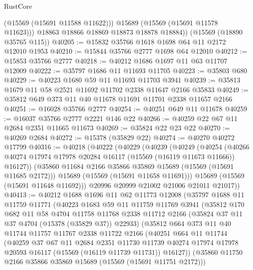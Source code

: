 \begin{lexlean}{RustCore}
\begin{coremodule}
            (@15569 (@15691 @11588 @11622)))
          @15689
          (@15569 (@15691 @11578 @11623)))
        @18863
        @18866
        @18869
        @18873
        @18878
        @18884))
    (@15569 (@18890 @35765 @115))
@40205 := @15832 @35766 @1618 @1698 @64 @11 @2172 @12010 @1953
@40210 := @15844 @35766 @2777 @1698 @64 @12010
@40212 := @15853 @35766 @2777
@40218 := @40212 @1686 @1697 @11 @63 @11707 @12009
@40222 := @35797 @1686 @11 @11693 @11705
@40223 := @35803 @680
@40229 := @40223 @1680 @59 @11 @11693 @11703 @3941
@40239 := @35813 @1679 @11 @58 @2521 @11692 @11702 @2338 @11647 @2166 @35833
@40249 := @35812 @649 @373 @11 @40 @11678 @11691 @11701 @2338 @11657 @2166
@40251 := @16028 @35766 @2777
@40254 := @40251 @649 @11 @11678
@40259 := @16037 @35766 @2777 @2221 @146 @22
@40266 := @40259 @22 @67 @11 @2684 @2351 @11665 @11673
@40269 := @35824 @22 @23 @22
@40270 := @40269 @2684
@40272 := @15378 (@35829 @22)
@40274 := @40270 @40272 @17799
@40316 := @40218
    (@40222
      (@40229
        (@40239
          (@40249
            (@40254
              (@40266 @40274 @17974 @17978 @20284 @16117 (@15569 (@16119 @11673 @11666)) @16127))
            (@35860 @11684 @2166 @35866 @35869 @15689 (@15569 (@15691 @11685 @2172)))
            @15689
            (@15569 (@15691 @11658 @11691)))
          @15689
          (@15569 (@15691 @11648 @11692)))
        @20996
        @20999
        @21002
        @21006
        @21011
        @21017))
@40413 := @40212
    @1688
    @1696
    @11
    @62
    @11773
    @12008
    (@35797
      @1688
      @11
      @11759
      @11771
      (@40223
        @1683
        @59
        @11
        @11759
        @11769
        @3941
        (@35812
          @170
          @682
          @11
          @58
          @4704
          @11758
          @11768
          @2338
          @11712
          @2166
          (@35824 @37 @11 @37 @4704 (@15378 (@35829 @37)) @22933)
          (@35812
            @664
            @373
            @11
            @40
            @11744
            @11757
            @11767
            @2338
            @11722
            @2166
            (@40251
              @664
              @11
              @11744
              (@40259
                @37
                @67
                @11
                @2684
                @2351
                @11730
                @11739
                @40274
                @17974
                @17978
                @20593
                @16117
                (@15569 (@16119 @11739 @11731))
                @16127))
            (@35860 @11750 @2166 @35866 @35869 @15689 (@15569 (@15691 @11751 @2172)))

\end{coremodule}
\end{lexlean}
